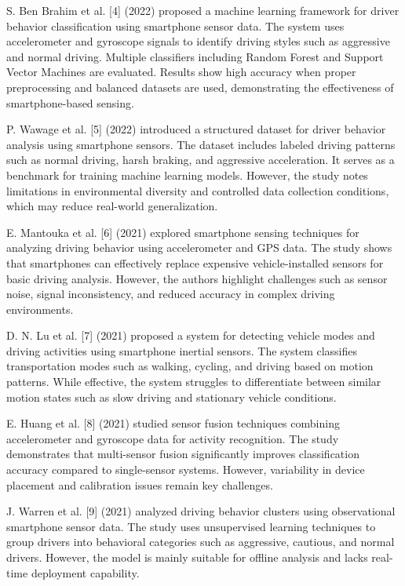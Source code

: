 S. Ben Brahim et al. [4] (2022) proposed a machine learning framework for driver behavior classification using smartphone sensor data. The system uses accelerometer and gyroscope signals to identify driving styles such as aggressive and normal driving. Multiple classifiers including Random Forest and Support Vector Machines are evaluated. Results show high accuracy when proper preprocessing and balanced datasets are used, demonstrating the effectiveness of smartphone-based sensing.

P. Wawage et al. [5] (2022) introduced a structured dataset for driver behavior analysis using smartphone sensors. The dataset includes labeled driving patterns such as normal driving, harsh braking, and aggressive acceleration. It serves as a benchmark for training machine learning models. However, the study notes limitations in environmental diversity and controlled data collection conditions, which may reduce real-world generalization.

E. Mantouka et al. [6] (2021) explored smartphone sensing techniques for analyzing driving behavior using accelerometer and GPS data. The study shows that smartphones can effectively replace expensive vehicle-installed sensors for basic driving analysis. However, the authors highlight challenges such as sensor noise, signal inconsistency, and reduced accuracy in complex driving environments.

D. N. Lu et al. [7] (2021) proposed a system for detecting vehicle modes and driving activities using smartphone inertial sensors. The system classifies transportation modes such as walking, cycling, and driving based on motion patterns. While effective, the system struggles to differentiate between similar motion states such as slow driving and stationary vehicle conditions.

E. Huang et al. [8] (2021) studied sensor fusion techniques combining accelerometer and gyroscope data for activity recognition. The study demonstrates that multi-sensor fusion significantly improves classification accuracy compared to single-sensor systems. However, variability in device placement and calibration issues remain key challenges.

J. Warren et al. [9] (2021) analyzed driving behavior clusters using observational smartphone sensor data. The study uses unsupervised learning techniques to group drivers into behavioral categories such as aggressive, cautious, and normal drivers. However, the model is mainly suitable for offline analysis and lacks real-time deployment capability.

